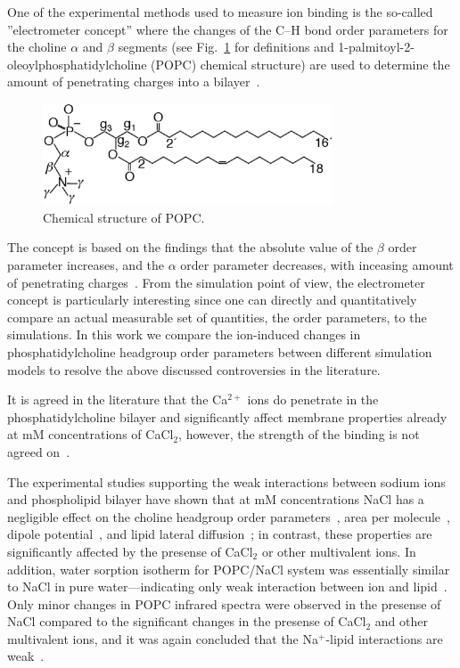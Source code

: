 \documentclass[pre,aps,floatfix,authordate1-4,twocolumn]{revtex4-1}
\begin{document}
One of the experimental methods used to measure ion binding is the so-called
''electrometer concept'' where the changes of the C--H bond order parameters for the 
choline $\alpha$ and $\beta$ segments (see Fig.~\ref{POPCstructure} for definitions and 1-palmitoyl-2-oleoylphosphatidylcholine (POPC) 
chemical structure) are used to determine the amount of penetrating charges into a bilayer~\cite{akutsu81,altenbach84,seelig87,scherer89}.
\begin{figure}[]
  \centering
  \includegraphics[width=8.6cm]{../Fig/POPCstructure.eps}

  \caption{\label{POPCstructure}
    Chemical structure of POPC.}
  
\end{figure}
The concept is based on the findings that the absolute value of the $\beta$ order parameter
increases, and the $\alpha$ order parameter decreases, with inceasing amount of penetrating 
charges~\cite{akutsu81,altenbach84,seelig87,scherer89}. 
From the simulation point of view, the electrometer concept is particularly interesting since one
can directly and quantitatively compare an actual measurable set of quantities, the order parameters, to the simulations.
In this work we compare the ion-induced changes in phosphatidylcholine headgroup order parameters
between different simulation models to resolve the above discussed controversies in the literature.

It is agreed in the literature that the Ca$^{2+}$ ions do penetrate in the phosphatidylcholine bilayer and
significantly affect membrane properties already at mM concentrations of CaCl$_2$, however, the strength of the binding is not agreed on~\cite{tatulian87,altenbach84,bockmann04}.




The experimental studies supporting the weak interactions between sodium ions and phospholipid bilayer
have shown that at mM concentrations NaCl has a negligible effect on the
choline headgroup order parameters~\cite{akutsu81}, area per molecule~\cite{pabst07}, dipole potential~\cite{clarke99},
and lipid lateral diffusion~\cite{filippov09}; in contrast, these properties are significantly affected by the presense
of CaCl$_2$ or other multivalent ions. In addition, water sorption isotherm for POPC/NaCl system
was essentially similar to NaCl in pure water---indicating only weak interaction between ion and lipid~\cite{binder02}.
Only minor changes in POPC infrared spectra were observed in the presense of NaCl compared to the significant 
changes in the presense of CaCl$_2$ and other multivalent ions, and it was again concluded that the Na$^+$-lipid interactions are weak~\cite{binder02}.
\end{document}
